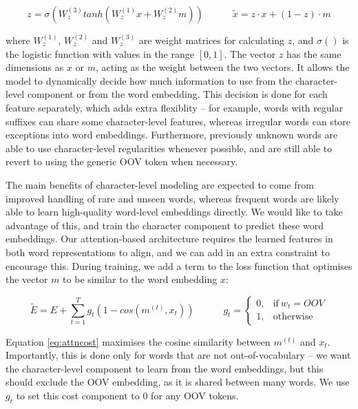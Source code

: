 \documentclass[11pt]{article}
\begin{document}
\begin{equation}
z = \sigma(W^{(3)}_z tanh(W^{(1)}_{z} x + W^{(2)}_{z} m)) \hspace{3em}
\widetilde{x} = z\cdot x + (1-z) \cdot m
\end{equation}


\noindent where $W^{(1)}_{z}$, $W^{(2)}_{z}$ and $W^{(3)}_{z}$ are weight matrices for calculating $z$, and $\sigma()$ is the logistic function with values in the range $[0,1]$. The vector $z$ has the same dimensions as $x$ or $m$, acting as the weight between the two vectors. It allows the model to dynamically decide how much information to use from the character-level component or from the word embedding. This decision is done for each feature separately, which adds extra flexiblity -- for example, words with regular suffixes can share some character-level features, whereas irregular words can store exceptions into word embeddings.
Furthermore, previously unknown words are able to use character-level regularities whenever possible, and are still able to revert to using the generic OOV token when necessary.

The main benefits of character-level modeling are expected to come from improved handling of rare and unseen words, whereas frequent words are likely able to learn high-quality word-level embeddings directly. We would like to take advantage of this, and train the character component to predict these word embeddings.
Our attention-based architecture requires the learned features in both word representations to align, and we can add in an extra constraint to encourage this. During training, we add a term to the loss function that optimises the vector $m$ to be similar to the word embedding $x$:

\begin{equation}
\label{eq:attncost}
\widetilde{E} = E + \sum_{t=1}^{T} g_t (1 - cos(m^{(t)}, x_t)) \hspace{3em}
g_t =
\begin{cases}
      0, & \text{if}\ w_t = OOV \\
      1, & \text{otherwise}
    \end{cases}
\end{equation}

\noindent Equation \ref{eq:attncost} maximises the cosine similarity between $m^{(t)}$ and $x_t$. Importantly, this is done only for words that are not out-of-vocabulary -- we want the character-level component to learn from the word embeddings, but this should exclude the OOV embedding, as it is shared between many words. We use $g_t$ to set this cost component to $0$ for any OOV tokens.
\end{document}
